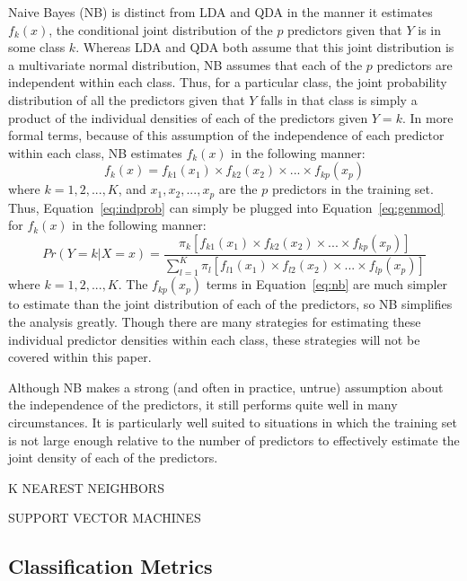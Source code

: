 \documentclass[12pt]{article}
\begin{document}
Naive Bayes (NB) is distinct from LDA and QDA in the manner it estimates $f_k(x)$, 
the conditional joint distribution of the $p$ predictors given that $Y$ is in some 
class $k$.  Whereas LDA and QDA both assume that this joint distribution is a multivariate 
normal distribution, NB assumes that each of the $p$ predictors are independent within each 
class.  Thus, for a particular class, the joint probability distribution of all the 
predictors given that $Y$ falls in that class is simply a product of the individual densities 
of each of the predictors given $Y = k$.  In more formal terms, because of this assumption of 
the independence of each predictor within each class, NB estimates $f_k(x)$ in the following 
manner:
\begin{equation}
  \label{eq:indprob}
  f_k(x) = f_{k1}(x_1) \times f_{k2}(x_2) \times ... \times f_{kp}(x_p)
\end{equation} 
where $k = 1, 2, ..., K$, and $x_1, x_2, ..., x_p$ are the $p$ predictors in the training set.  
Thus, Equation~\eqref{eq:indprob} can simply be plugged into Equation~\eqref{eq:genmod} for 
$f_k(x)$ in the following manner:
\begin{equation}
  \label{eq:nb}
   Pr(Y = k | X = x) =
  \frac{\pi_k [f_{k1}(x_1) \times f_{k2}(x_2) \times ... \times f_{kp}(x_p)]} 
  {\sum_{l = 1} ^ {K} \pi_l [f_{l1}(x_1) \times f_{l2}(x_2) \times ... \times f_{lp}(x_p)]}
\end{equation} 
where $k = 1, 2, ..., K$.  The $f_{kp}(x_p)$ terms in Equation~\eqref{eq:nb} are much simpler 
to estimate than the joint distribution of each of the predictors, so NB simplifies the 
analysis greatly.  Though there are many strategies for estimating these individual predictor 
densities within each class, these strategies will not be covered within this paper.  

Although NB makes a strong (and often in practice, untrue) assumption about the independence 
of the predictors, it still performs quite well in many circumstances.  It is particularly 
well suited to situations in which the training set is not large enough relative to the 
number of predictors to effectively estimate the joint density of each of the predictors.  

K NEAREST NEIGHBORS

SUPPORT VECTOR MACHINES

\subsection{Classification Metrics}
\label{sec:metr}
\end{document}
